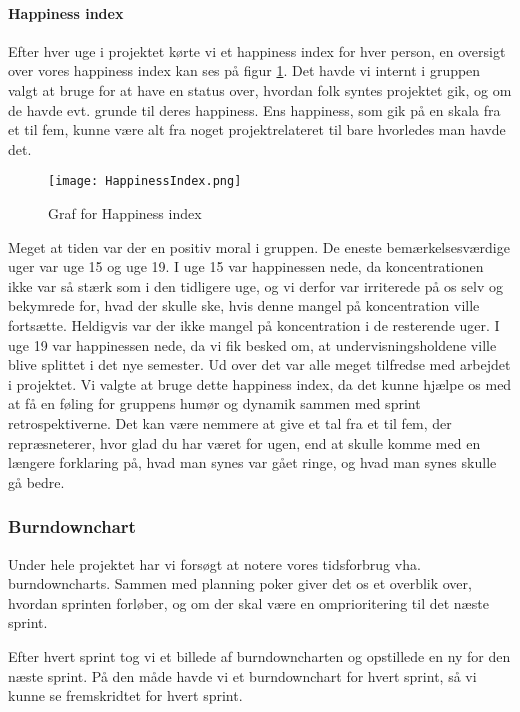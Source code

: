 \paragraph*{Happiness index}
Efter hver uge i projektet kørte vi et happiness index for hver person, en oversigt over vores happiness index kan ses på figur \ref{happinessindex}.
Det havde vi internt i gruppen valgt at bruge for at have en status over, hvordan folk syntes projektet gik, og om de havde evt. grunde til deres happiness.
Ens happiness, som gik på en skala fra et til fem, kunne være alt fra noget projektrelateret til bare hvorledes man havde det.

\begin{figure}[h]
    \caption{Graf for Happiness index}
    \centering
        \texttt{[image: HappinessIndex.png]}
    \label{happinessindex}
\end{figure}

Meget at tiden var der en positiv moral i gruppen.
De eneste bemærkelsesværdige uger var uge 15 og uge 19.
I uge 15 var happinessen nede, da koncentrationen ikke var så stærk som i den tidligere uge, og vi derfor var irriterede på os selv og bekymrede for, hvad der skulle ske, hvis denne mangel på koncentration ville fortsætte.
Heldigvis var der ikke mangel på koncentration i de resterende uger.
I uge 19 var happinessen nede, da vi fik besked om, at undervisningsholdene ville blive splittet i det nye semester.
Ud over det var alle meget tilfredse med arbejdet i projektet.
Vi valgte at bruge dette happiness index, da det kunne hjælpe os med at få en føling for gruppens humør og dynamik sammen med sprint retrospektiverne.
Det kan være nemmere at give et tal fra et til fem, der repræsneterer, hvor glad du har været for ugen, end at skulle komme med en længere forklaring på, hvad man synes var gået ringe, og hvad man synes skulle gå bedre.

\subsubsection{Burndownchart}

Under hele projektet har vi forsøgt at notere vores tidsforbrug vha. burndowncharts.
Sammen med planning poker giver det os et overblik over, hvordan sprinten forløber, og om der skal være en omprioritering til det næste sprint. 

Efter hvert sprint tog vi et billede af burndowncharten og opstillede en ny for den næste sprint.
På den måde havde vi et burndownchart for hvert sprint, så vi kunne se fremskridtet for hvert sprint.

